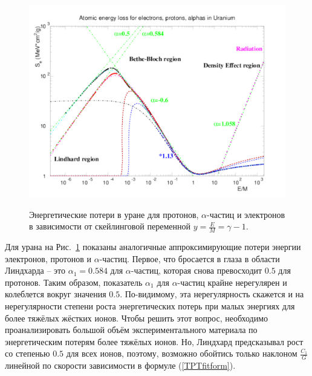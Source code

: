 \documentclass[a4paper,12pt]{article}
\begin{document}
\begin{large}
    \begin{figure}[ht]
    {
       \includegraphics[width=0.99\linewidth]{images/epa_u_l}
    }
    \caption{Энергетические потери в уране для протонов, $\alpha$-частиц и электронов в зависимости от скейлинговой переменной $y=\frac{E}{M}=\gamma-1$.}
    \label{fig:dEdxUL}
  \end{figure}
  Для урана на Рис.~\ref{fig:dEdxUL} показаны аналогичные аппроксимирующие потери энергии электронов, протонов и $\alpha$-частиц.
  Первое, что бросается в глаза в области Линдхарда -- это $\alpha_1=0.584$ для $\alpha$-частиц, которая снова превосходит $0.5$ для протонов.
  Таким образом, показатель $\alpha_1$ для $\alpha$-частиц крайне нерегулярен и колеблется вокруг значения $0.5$.
  По-видимому, эта нерегулярность скажется и на нерегулярности степени роста энергетических потерь при малых энергиях для более тяжёлых жёстких ионов.
  Чтобы решить этот вопрос, необходимо проанализировать большой объём экспериментального материала по энергетическим потерям более тяжёлых ионов.
  Но, Линдхард предсказывал рост со степенью $0.5$ для всех ионов, поэтому, возможно обойтись только наклоном $\frac{C_1}{G}$ линейной по скорости зависимости в формуле (\ref{TPTfitform}).


\end{large}
\end{document}
